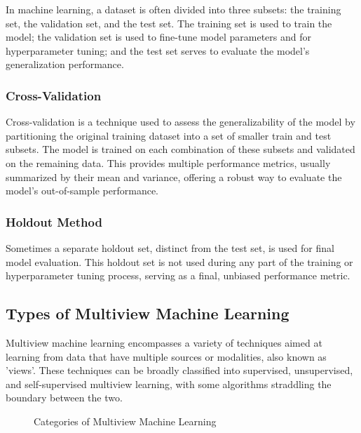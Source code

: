 In machine learning, a dataset is often divided into three subsets: the training set, the validation set, and the test set. The training set is used to train the model; the validation set is used to fine-tune model parameters and for hyperparameter tuning; and the test set serves to evaluate the model's generalization performance. 

\subsubsection{Cross-Validation}

Cross-validation is a technique used to assess the generalizability of the model by partitioning the original training dataset into a set of smaller train and test subsets. The model is trained on each combination of these subsets and validated on the remaining data. This provides multiple performance metrics, usually summarized by their mean and variance, offering a robust way to evaluate the model's out-of-sample performance.

\subsubsection{Holdout Method}

Sometimes a separate holdout set, distinct from the test set, is used for final model evaluation. This holdout set is not used during any part of the training or hyperparameter tuning process, serving as a final, unbiased performance metric.

\subsection{Types of Multiview Machine Learning}

Multiview machine learning encompasses a variety of techniques aimed at learning from data that have multiple sources or modalities, also known as 'views'. These techniques can be broadly classified into supervised, unsupervised, and self-supervised multiview learning, with some algorithms straddling the boundary between the two. 

\begin{figure}
    \centering
    \caption{Categories of Multiview Machine Learning}
    \label{fig:multiview_ml}
\end{figure}

